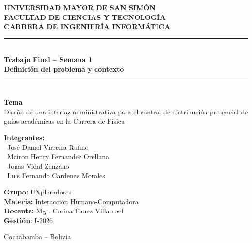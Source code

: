 \documentclass[12pt,letterpaper]{article}
\begin{document}
\begin{titlepage}
    \centering

    {\large \textbf{UNIVERSIDAD MAYOR DE SAN SIMÓN}}\\
    {\large \textbf{FACULTAD DE CIENCIAS Y TECNOLOGÍA}}\\
    {\large \textbf{CARRERA DE INGENIERÍA INFORMÁTICA}}\\[0.5cm]

    \rule{\textwidth}{0.5pt}\\[0.5cm]
    {\Large \textbf{Trabajo Final -- Semana 1}}\\[0.3cm]
    {\large \textbf{Definición del problema y contexto}}\\[0.5cm]
    \rule{\textwidth}{0.5pt}\\[1cm]

    {\large \textbf{Tema}}\\[0.3cm]
    {\large Diseño de una interfaz administrativa para el control de distribución presencial de guías académicas en la Carrera de Física}\\[2cm]

    {
    \begin{flushleft}
        \textbf{Integrantes:}\\
        \hspace*{0.5cm}\textbullet\ José Daniel Virreira Rufino\\
        \hspace*{0.5cm}\textbullet\ Mairon Henry Fernandez Orellana\\
        \hspace*{0.5cm}\textbullet\ Jonas Vidal Zenzano\\
        \hspace*{0.5cm}\textbullet\ Luis Fernando Cardenas Morales
    \end{flushleft}
    }
    \begin{flushleft}
        \textbf{Grupo:} UXploradores\\
        \textbf{Materia:} Interacción Humano-Computadora\\
        \textbf{Docente:} Mgr. Corina Flores Villarroel\\
        \textbf{Gestión:} I-2026
    \end{flushleft}

    \vfill

    {\small Cochabamba -- Bolivia}\\
\end{titlepage}

\tableofcontents
\newpage
\end{document}
